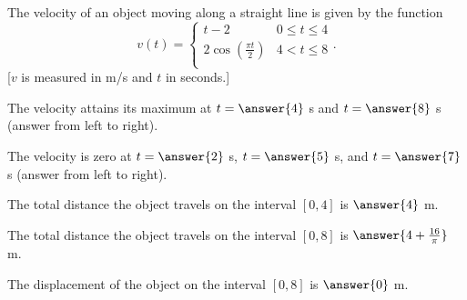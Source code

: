 \documentclass{ximera}
\author{Nela Lakos \and Kyle Parsons}
\begin{document}
\begin{exercise}

The velocity of an object moving along a straight line is given by the function
\[
v(t) = 
\begin{cases}
t-2 & 0\leq t\leq4\\
2\cos\left(\frac{\pi t}{2}\right) & 4<t\leq8\\
\end{cases}.
\]
[$v$ is measured in m/s and $t$ in seconds.]


The velocity attains its maximum at $t=\answer{4}$ s  and $t=\answer{8}$ s  (answer from left to right).

The velocity is zero at $t=\answer{2}$ s, $t=\answer{5}$ s, and $t=\answer{7}$ s  (answer from left to right).

The total distance the object travels on the interval $[0,4]$ is $\answer{4}$ m.

The total distance the object travels on the interval $[0,8]$ is $\answer{4+\frac{16}{\pi}}$ m.

The displacement of the object on the interval $[0,8]$ is $\answer{0}$ m.

\end{exercise}
\end{document}
